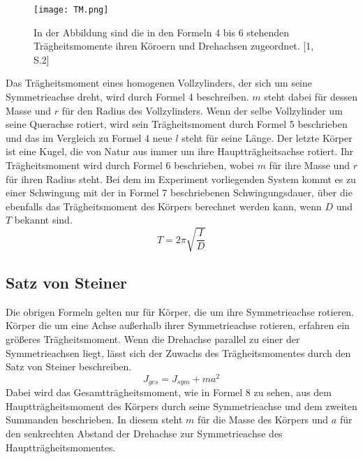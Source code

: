 \documentclass[titlepage = firstcover]{scrartcl}
\begin{document}
      \begin{figure}[h]
        \centering
        \texttt{[image: TM.png]}
        \caption{In der Abbildung sind die in den Formeln 4 bis 6 stehenden Trägheitsmomente ihren Köroern und Drehachsen zugeordnet. [1, S.2]}
      \end{figure}
      Das Trägheitsmoment eines homogenen  Vollzylinders, der sich um seine Symmetrieachse dreht, wird durch Formel 4 beschreiben. $m$ steht dabei für dessen
      Masse und $r$ für den Radius des Vollzylinders. Wenn der selbe Vollzylinder um seine Querachse rotiert, wird sein Trägheitsmoment durch Formel 5 beschrieben 
      und das im Vergleich zu Formel 4 neue $l$ steht für seine Länge. Der letzte Körper ist eine Kugel, die von Natur aus immer um ihre Hauptträgheitsachse 
      rotiert. Ihr Trägheitsmoment wird durch Formel 6 beschrieben, wobei $m$ für ihre Masse und $r$ für ihren Radius steht. Bei dem im Experiment vorliegenden System
      kommt es zu einer Schwingung mit der in Formel 7 beschriebenen Schwingungsdauer, über die ebenfalls das Trägheitsmoment des Körpers berechnet werden kann, wenn
      $D$ und $T$ bekannt sind.
      \begin{equation}
        T = 2\pi \sqrt{\frac{I}{D}}
      \end{equation}

      \subsection{Satz von Steiner}
      Die obrigen Formeln gelten nur für Körper, die um ihre Symmetrieachse rotieren. Körper die um eine Achse außerhalb ihrer Symmetrieachse rotieren, erfahren
      ein größeres Trägheitsmoment. Wenn die Drehachse parallel zu einer der Symmetrieachsen liegt, lässt sich der Zuwachs des Trägheitsmomentes durch den Satz 
      von Steiner beschreiben. 
      \begin{equation}
        J_{ges} = J_{sym} + ma^2
      \end{equation}
      Dabei wird das Gesamtträgheitsmoment, wie in Formel 8 zu sehen, aus dem Hauptträgheitsmoment des Körpers durch seine Symmetrieachse und dem zweiten 
      Summanden beschrieben. In diesem steht $m$ für die Masse des Körpers und $a$ für den senkrechten Abstand der Drehachse zur Symmetrieachse des
      Hauptträgheitsmomentes.
\end{document}
